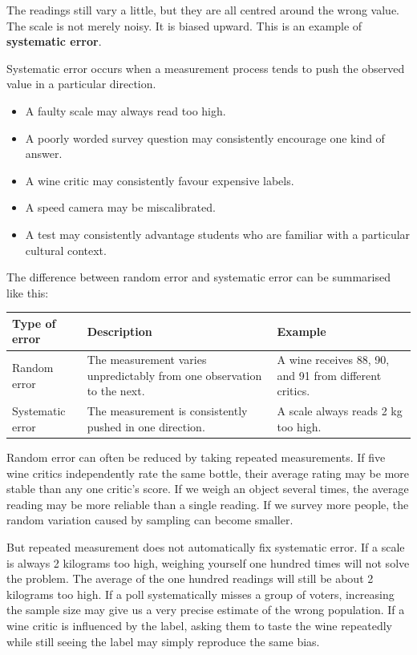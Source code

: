 \documentclass[
  letterpaper,
  DIV=11,
  numbers=noendperiod]{scrreprt}
\providecommand{\tightlist}{%
  \setlength{\itemsep}{0pt}\setlength{\parskip}{0pt}}
\begin{document}
The readings still vary a little, but they are all centred around the
wrong value. The scale is not merely noisy. It is biased upward. This is
an example of \textbf{systematic error}.

Systematic error occurs when a measurement process tends to push the
observed value in a particular direction.

\begin{itemize}
\tightlist
\item
  A faulty scale may always read too high.
\item
  A poorly worded survey question may consistently encourage one kind of
  answer.
\item
  A wine critic may consistently favour expensive labels.
\item
  A speed camera may be miscalibrated.
\item
  A test may consistently advantage students who are familiar with a
  particular cultural context.
\end{itemize}

The difference between random error and systematic error can be
summarised like this:

\begin{table}
\fontsize{12.0pt}{14.0pt}\selectfont
\begin{tabular*}{\linewidth}{@{\extracolsep{\fill}}lll}
\toprule
Type of error & Description & Example \\ 
\midrule\addlinespace[2.5pt]
Random error & The measurement varies unpredictably from one observation to the next. & A wine receives 88, 90, and 91 from different critics. \\ 
Systematic error & The measurement is consistently pushed in one direction. & A scale always reads 2 kg too high. \\ 
\bottomrule
\end{tabular*}
\end{table}

Random error can often be reduced by taking repeated measurements. If
five wine critics independently rate the same bottle, their average
rating may be more stable than any one critic's score. If we weigh an
object several times, the average reading may be more reliable than a
single reading. If we survey more people, the random variation caused by
sampling can become smaller.

But repeated measurement does not automatically fix systematic error. If
a scale is always 2 kilograms too high, weighing yourself one hundred
times will not solve the problem. The average of the one hundred
readings will still be about 2 kilograms too high. If a poll
systematically misses a group of voters, increasing the sample size may
give us a very precise estimate of the wrong population. If a wine
critic is influenced by the label, asking them to taste the wine
repeatedly while still seeing the label may simply reproduce the same
bias.
\end{document}
